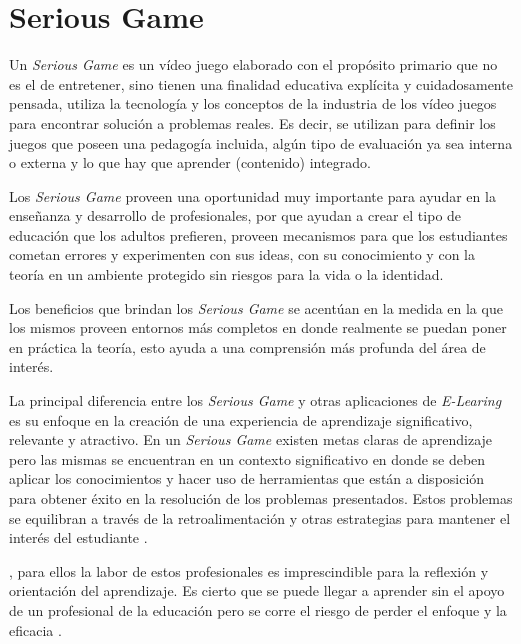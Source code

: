 \section{Serious Game}
\label{sec:tics_JUEGO_SERIO}

Un \emph{Serious Game} es un vídeo juego elaborado con el propósito primario que
no es el de entretener\cite{sg:aoverview}, sino tienen una finalidad educativa
explícita y cuidadosamente pensada, utiliza la tecnología y los conceptos de la
industria de los vídeo juegos para encontrar solución a problemas reales. Es
decir, se utilizan para definir los juegos que poseen una pedagogía incluida,
algún tipo de evaluación ya sea interna o externa y lo que hay que aprender
(contenido) integrado\cite{damien:sg}.

Los \emph{Serious Game} proveen una oportunidad muy importante para ayudar en la
enseñanza y desarrollo de profesionales, por que ayudan a crear el tipo de
educación que los adultos prefieren, proveen mecanismos para que los estudiantes
cometan errores y experimenten con sus ideas, con su conocimiento y con la
teoría en un ambiente protegido sin riesgos para la vida o la identidad. 

Los beneficios que brindan los \emph{Serious Game} se acentúan en la medida en
la que los mismos proveen entornos más completos en donde realmente se puedan
poner en práctica la teoría, esto ayuda a una comprensión más profunda del área
de interés.

La principal diferencia entre los \emph{Serious Game} y otras aplicaciones de
\emph{E-Learing} es su enfoque en la creación de una experiencia de aprendizaje
significativo, relevante y atractivo. En un \emph{Serious Game} existen metas
claras de aprendizaje pero las mismas se encuentran en un contexto significativo
en donde se deben aplicar los conocimientos y hacer uso de herramientas que
están a disposición para obtener éxito en la resolución de los problemas
presentados. Estos problemas se equilibran a través de la retroalimentación y
otras estrategias para mantener el interés del estudiante
\cite{papertian:const}.

, para ellos la labor de estos
profesionales es imprescindible para la reflexión y orientación del aprendizaje.
Es cierto que se puede llegar a aprender sin el apoyo de un profesional de la
educación pero se corre el riesgo de perder el enfoque y la eficacia
\cite{elearning:seiousgames}. 

